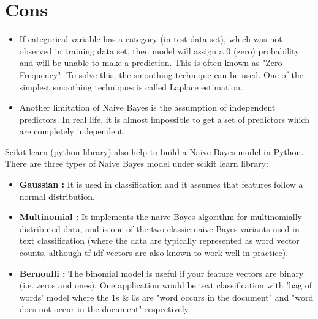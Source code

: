 \chapter{\textbf{Cons}}
\begin{itemize}
	\item If categorical variable has a category (in test data set), which was not observed in training data set, then model will assign a 0 (zero) probability and will be unable to make a prediction. This is often known as "Zero Frequency". To solve this, the smoothing technique can be used. One of the simplest smoothing techniques is called Laplace estimation.
	\item Another limitation of Naive Bayes is the assumption of independent predictors. In real life, it is almost impossible to get a set of predictors which are completely independent.
\end{itemize}

Scikit learn (python library) also help to build a Naive Bayes model in Python. There are three types of Naive Bayes model under scikit learn library:
\begin{itemize}
	\item \textbf{Gaussian :} It is used in classification and it assumes that features follow a normal distribution.
	\item \textbf{Multinomial :} It implements the naive Bayes algorithm for multinomially distributed data, and is one of the two classic naive Bayes variants used in text classification (where the data are typically represented as word vector counts, although tf-idf vectors are also known to work well in practice). 
	\item \textbf{Bernoulli :} The binomial model is useful if your feature vectors are binary (i.e. zeros and ones). One application would be text classification with 'bag of words' model where the 1s \& 0s are "word occurs in the document" and "word does not occur in the document" respectively.
\end{itemize}
